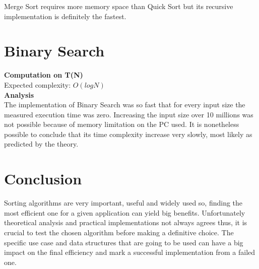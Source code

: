 \documentclass{article}
\begin{document}
Merge Sort requires more memory space than Quick Sort but its recursive implementation is definitely the fastest.

\newpage
\section{Binary Search}

\begin{center}
\end{center}


\textbf{Computation on T(N)}\\

Expected complexity: $O(logN)$\\

\textbf{Analysis}\\

The implementation of Binary Search was so fast that for every input size the measured execution time was zero. Increasing the input size over 10 millions was not possible because of memory limitation on the PC used. It is nonetheless possible to conclude that its time complexity increase very slowly, most likely as predicted by the theory.

\newpage
\section{Conclusion}

Sorting algorithms are very important, useful and widely used so, finding the most efficient one for a given application can yield big benefits. Unfortunately theoretical analysis and practical implementations not always agrees thus, it is crucial to test the chosen algorithm before making a definitive choice. The specific use case and data structures that are going to be used can have a big impact on the final efficiency and mark a successful implementation from a failed one.

\newpage

\nocite{*}
\printbibliography[] %
\end{document}
